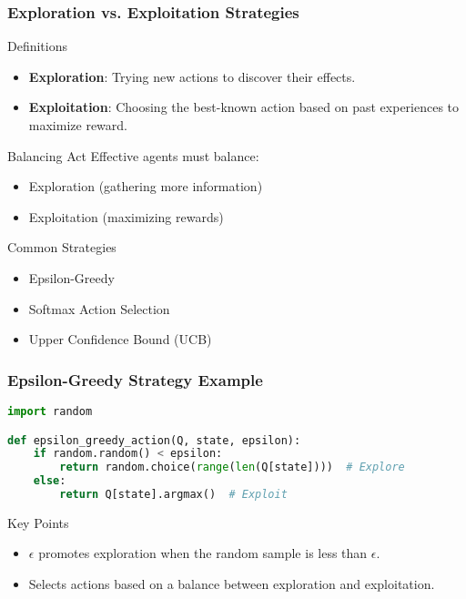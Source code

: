 \documentclass[aspectratio=169]{beamer}
\begin{document}
\begin{frame}[fragile]
    \frametitle{Exploration vs. Exploitation Strategies}
    \begin{block}{Definitions}
        \begin{itemize}
            \item \textbf{Exploration}: Trying new actions to discover their effects.
            \item \textbf{Exploitation}: Choosing the best-known action based on past experiences to maximize reward.
        \end{itemize}
    \end{block}
    \begin{block}{Balancing Act}
        Effective agents must balance:
        \begin{itemize}
            \item Exploration (gathering more information)
            \item Exploitation (maximizing rewards)
        \end{itemize}
    \end{block}
    \begin{block}{Common Strategies}
        \begin{itemize}
            \item Epsilon-Greedy
            \item Softmax Action Selection
            \item Upper Confidence Bound (UCB)
        \end{itemize}
    \end{block}
\end{frame}

\begin{frame}[fragile]
    \frametitle{Epsilon-Greedy Strategy Example}
    \begin{lstlisting}[language=Python]
import random

def epsilon_greedy_action(Q, state, epsilon):
    if random.random() < epsilon:
        return random.choice(range(len(Q[state])))  # Explore
    else:
        return Q[state].argmax()  # Exploit
    \end{lstlisting}
    \begin{block}{Key Points}
        \begin{itemize}
            \item $\epsilon$ promotes exploration when the random sample is less than $\epsilon$.
            \item Selects actions based on a balance between exploration and exploitation.
        \end{itemize}
    \end{block}
\end{frame}
\end{document}
